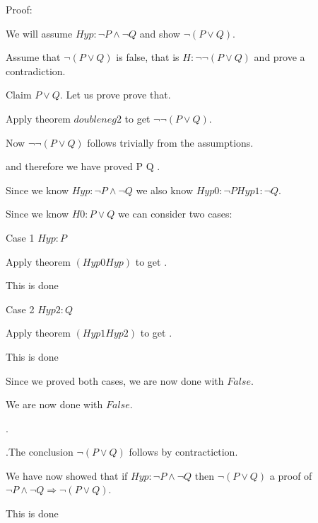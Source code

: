\documentclass[11pt, oneside]{article}
\begin{document}
 Proof: \begin{subproof}We will assume $Hyp : ¬ P \land ¬ Q $ and show $¬ (P \lor Q) $.\begin{subproof}Assume that $¬ (P \lor Q) $ is false, that is $H : ¬ ¬ (P \lor Q) $ and prove a contradiction.\begin{subproof}Claim $P \lor Q $. Let us prove prove that. 

 \begin{subproof}Apply theorem $doubleneg2$ to get $¬ ¬ (P \lor Q) $.\begin{subproof}Now $¬ ¬ (P \lor Q) $ follows trivially from the assumptions.\end{subproof}\end{subproof} and therefore we have proved P \lor Q .\begin{subproof}Since we know $Hyp : ¬ P \land ¬ Q $ we also know $Hyp0 : ¬ P 
Hyp1 : ¬ Q $.\begin{subproof}Since we know $H0 : P \lor Q $ we can consider two cases: 

 Case 1 $Hyp : P $

 \begin{subproof}Apply theorem $(Hyp0 Hyp)$ to get $ $.\begin{subproof}This is done\end{subproof}\end{subproof} 

 Case 2 $Hyp2 : Q $

 \begin{subproof}Apply theorem $(Hyp1 Hyp2)$ to get $ $.\begin{subproof}This is done\end{subproof}\end{subproof} Since we proved both cases, we are now done with $False $.\end{subproof} We are now done with $False $.\end{subproof}.\end{subproof}.The conclusion $¬ (P \lor Q) $ follows by contractiction.\end{subproof} We have now showed that if $Hyp : ¬ P \land ¬ Q $ then $¬ (P \lor Q) $ a proof of $¬ P \land ¬ Q \Rightarrow ¬ (P \lor Q) $.\end{subproof}This is done
\end{document}
